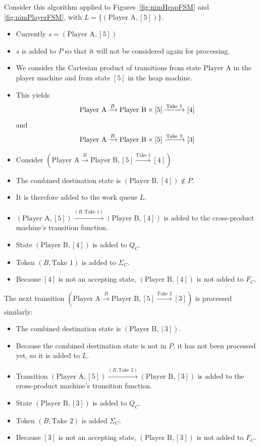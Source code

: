 \documentclass[sigplan,anonymous,review]{acmart}
\begin{document}
Consider this algorithm applied to Figures~\ref{fig:nimHeapFSM} and \ref{fig:nimPlayerFSM}, with $L = \{(\text{Player A}, [5])\}$. 
\begin{itemize}
    \item Currently $s = (\text {Player A}, [5])$
    \item $s$ is added to $P$ so that it will not be considered again for processing.
    \item We consider the Cartesian product of transitions from state $\text{Player A}$ in the player machine and from state $[5]$ in the heap machine. 
    \item This yields 
\[
        \text{Player A} \xrightarrow{B} \text{Player B} \\ \times [5] \xrightarrow{\text{Take } 1} [4]
        \]
        and
        \[
        \text{Player A} \xrightarrow{B} \text{Player B} \\ \times  [5] \xrightarrow{\text{Take } 2} [3]
        \]
    \item Consider $(\text{Player A} \xrightarrow{B} \text{Player B}, [5] \xrightarrow{\text{Take } 1} [4])$
    \item The combined destination state is $(\text{Player B}, [4])\not\in P$.
    \item It is therefore added to the work queue $L$. 
    \item $(\text {Player A}, [5]) \xrightarrow{(B, \text{Take } 1)} (\text{Player B}, [4])$ is added to the cross-product machine's transition function.
    \item State $(\text{Player B}, [4])$ is added to $Q_C$.
    \item Token $(B, \text{Take } 1)$ is added to $\Sigma_C$.
    \item Because $[4]$ is not an accepting state, $(\text{Player B}, [4])$ is not added to $F_C$. 
\end{itemize}
The next transition $(\text{Player A} \xrightarrow{B} \text{Player B}, [5] \xrightarrow{\text{Take } 2} [3])$ is processed similarly:
\begin{itemize}
    \item The combined destination state is $(\text{Player B}, [3])$. 
    \item Because the combined destination state is not in $P$, it has not been processed yet, so it is added to $L$. 
    \item Transition $(\text {Player A}, [5]) \xrightarrow{(B, \text{Take } 2)} (\text{Player B}, [3])$ is added to the cross-product machine's transition function.
    \item State $(\text{Player B}, [3])$ is added to $Q_C$.
    \item Token $(B, \text{Take } 2)$ is added $\Sigma_C$.
    \item Because $[3]$ is not an accepting state, $(\text{Player B}, [3])$ is not added to $F_C$.  
\end{itemize}
\end{document}
